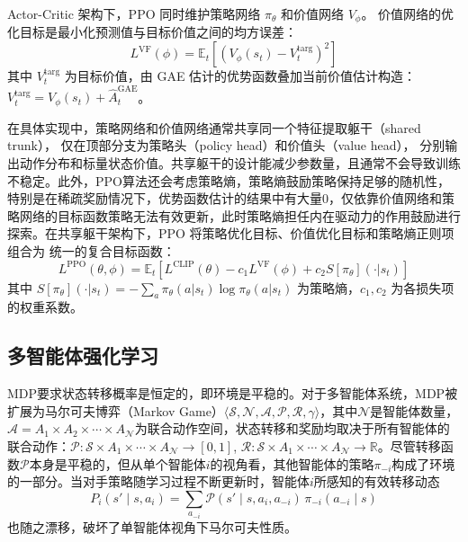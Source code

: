 \documentclass[12pt, a4paper, UTF8]{ctexart}
\numberwithin{equation}{section}
\begin{document}
Actor-Critic 架构下，PPO 同时维护策略网络 $\pi_\theta$ 和价值网络 $V_\phi$。
价值网络的优化目标是最小化预测值与目标价值之间的均方误差：
\begin{equation}
  L^{\text{VF}}(\phi) = \mathbb{E}_t\left[ \left( V_{\phi}(s_t) - V_t^{\text{targ}} \right)^2 \right]
  \label{eq:value_loss}
\end{equation}
其中 $V_t^{\text{targ}}$ 为目标价值，由 GAE 估计的优势函数叠加当前价值估计构造：
$V_t^{\text{targ}} = V_{\phi}(s_t) + \hat{A}_t^{\text{GAE}}$。

在具体实现中，策略网络和价值网络通常共享同一个特征提取躯干（shared trunk），
仅在顶部分支为策略头（policy head）和价值头（value head），
分别输出动作分布和标量状态价值。共享躯干的设计能减少参数量，且通常不会导致训练不稳定。此外，PPO算法还会考虑策略熵，策略熵鼓励策略保持足够的随机性，特别是在稀疏奖励情况下，优势函数估计的结果中有大量0，仅依靠价值网络和策略网络的目标函数策略无法有效更新，此时策略熵担任内在驱动力的作用鼓励进行探索。在共享躯干架构下，PPO 将策略优化目标、价值优化目标和策略熵正则项组合为
统一的复合目标函数：
\begin{equation}
  L^{\text{PPO}}(\theta, \phi) = \mathbb{E}_t\left[ 
  L^{\text{CLIP}}(\theta) - c_1 L^{\text{VF}}(\phi) + c_2 S[\pi_{\theta}](\cdot|s_t) 
  \right]
  \label{eq:ppo_full}
\end{equation}
其中 $S[\pi_{\theta}](\cdot|s_t) = -\sum_a \pi_\theta(a|s_t) \log \pi_\theta(a|s_t)$
为策略熵，$c_1, c_2$ 为各损失项的权重系数。

\subsection{多智能体强化学习}
\label{sec:multiagent_theory}
MDP要求状态转移概率是恒定的，即环境是平稳的。对于多智能体系统，MDP被扩展为马尔可夫博弈（Markov Game）$\langle \mathcal{S}, \mathcal{N}, \mathcal{A}, \mathcal{P}, \mathcal{R}, \gamma \rangle$，其中$\mathcal{N}$是智能体数量，$\mathcal{A}= A_1 \times A_2 \times \cdots \times A_\mathcal{N}$为联合动作空间，状态转移和奖励均取决于所有智能体的联合动作：$\mathcal{P}: \mathcal{S} \times A_1 \times \cdots \times A_\mathcal{N} \rightarrow [0,1]$, $\mathcal{R}: \mathcal{S} \times A_1 \times \cdots \times A_\mathcal{N} \rightarrow \mathbb{R}$。尽管转移函数$\mathcal{P}$本身是平稳的，但从单个智能体$i$的视角看，其他智能体的策略$\pi_{-i}$构成了环境的一部分。当对手策略随学习过程不断更新时，智能体$i$所感知的有效转移动态
\begin{equation}
  P_i(s' \mid s, a_i) = \sum_{a_{-i}} \mathcal{P}(s' \mid s, a_i, a_{-i}) \, \pi_{-i}(a_{-i} \mid s)
  \label{eq:effective_transition}
\end{equation}
也随之漂移，破坏了单智能体视角下马尔可夫性质。
\end{document}
